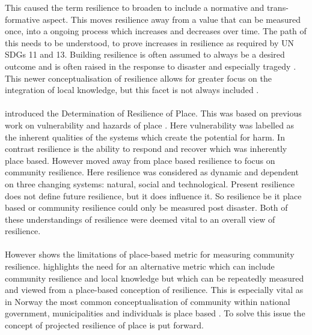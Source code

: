 This caused the term resilience to broaden to include a normative and trans-formative aspect.  This moves resilience away from a value that can be measured once, into a ongoing process which increases and decreases over time. The path of this needs to be understood, to prove increases in resilience as required by UN SDGs 11 and 13. Building resilience is often assumed to always be a desired outcome and is often raised in the response to disaster and especially tragedy \cite{moser_turbulent_2019}. This newer conceptualisation of resilience allows for greater focus on the integration of local knowledge, but this facet is not always included \cite{moser_turbulent_2019}.
\paragraph{}


\cite{cutter_place-based_2008} introduced the Determination of Resilience of Place. This was based on previous work on vulnerability and hazards of place \cite{cutter_vulnerability_1996}. Here vulnerability was labelled as the inherent qualities of the systems which create the potential for harm.
In contrast resilience is the ability to respond and recover which was inherently place based. However \cite{cutter_community_2020} moved away from place based resilience to focus on community resilience. Here resilience was considered as dynamic and dependent on three changing systems: natural, social and technological. Present resilience does not define future resilience, but it does influence it. So resilience be it place based or community resilience could only be measured post disaster. Both of these understandings of resilience were deemed vital to an overall view of resilience.
\paragraph{}

However \cite{rasanen_conceptualizing_2020} shows the limitations of place-based metric for measuring community resilience. \cite{rasanen_conceptualizing_2020} highlights the need for an alternative metric which can include community resilience and local knowledge but which can be repeatedly measured and viewed from a place-based conception of resilience. This is especially vital as in Norway the most common conceptualisation of community within national government, municipalities and individuals is place based \cite{rasanen_conceptualizing_2020}. To solve this issue the concept of projected resilience of place is put forward. 




